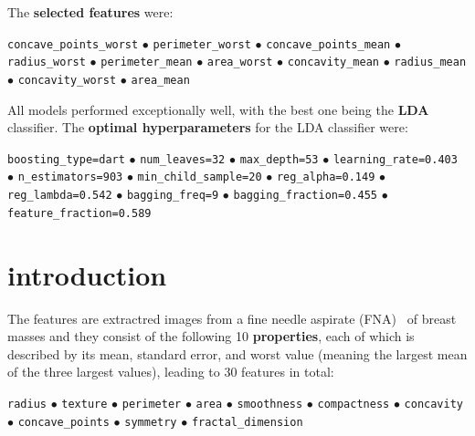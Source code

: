 \documentclass[12pt]{article}
\begin{document}
The \textbf{selected features} were:
\begin{center}
    \texttt{concave\_points\_worst}
    $\bullet$ 
    \texttt{perimeter\_worst}
    $\bullet$ 
    \texttt{concave\_points\_mean}
    $\bullet$ 
    \texttt{radius\_worst}
    $\bullet$ 
    \texttt{perimeter\_mean}
    $\bullet$ 
    \texttt{area\_worst}
    $\bullet$ 
    \texttt{concavity\_mean}
    $\bullet$ 
    \texttt{radius\_mean}
    $\bullet$ 
    \texttt{concavity\_worst}
    $\bullet$ 
    \texttt{area\_mean}
\end{center}

All models performed exceptionally well, with the best one being the
\textbf{LDA} classifier. The \textbf{optimal hyperparameters} for the LDA
classifier were:
\begin{center}
    \texttt{boosting\_type=dart}
    $\bullet$ 
    \texttt{num\_leaves=32}
    $\bullet$ 
    \texttt{max\_depth=53}
    $\bullet$ 
    \texttt{learning\_rate=0.403}
    $\bullet$ 
    \texttt{n\_estimators=903}
    $\bullet$ 
    \texttt{min\_child\_sample=20}
    $\bullet$ 
    \texttt{reg\_alpha=0.149}
    $\bullet$ 
    \texttt{reg\_lambda=0.542}
    $\bullet$ 
    \texttt{bagging\_freq=9}
    $\bullet$ 
    \texttt{bagging\_fraction=0.455}
    $\bullet$ 
    \texttt{feature\_fraction=0.589}
\end{center}



\section{introduction}

The features are extractred images from a fine needle aspirate
(FNA)~\cite{Yu2012} of breast masses and they consist of the following 10
\textbf{properties}, each of which is described by its mean, standard error, and
worst value (meaning the largest mean of the three largest values), leading to
30 features in total:
\begin{center}
    \texttt{radius}
    $\bullet$ 
    \texttt{texture}
    $\bullet$ 
    \texttt{perimeter}
    $\bullet$ 
    \texttt{area}
    $\bullet$ 
    \texttt{smoothness}
    $\bullet$ 
    \texttt{compactness}
    $\bullet$ 
    \texttt{concavity}
    $\bullet$ 
    \texttt{concave\_points}
    $\bullet$ 
    \texttt{symmetry}
    $\bullet$ 
    \texttt{fractal\_dimension}    
\end{center}
\end{document}
